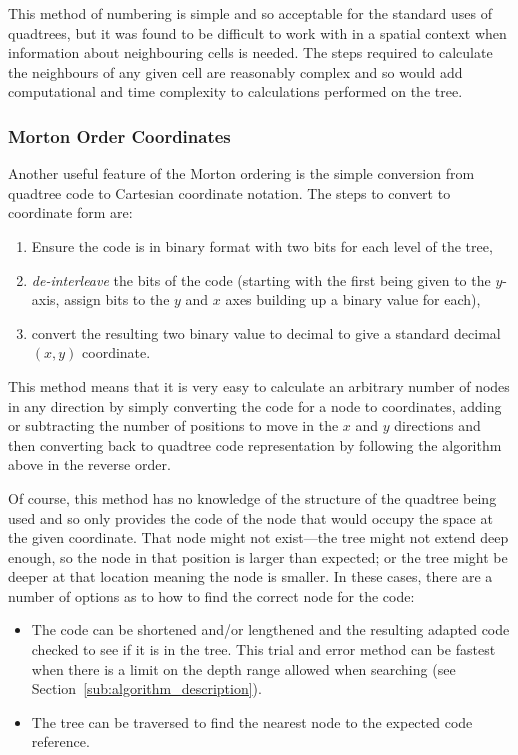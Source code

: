 This method of numbering is simple and so acceptable for the standard uses of
quadtrees, but it was found to be difficult to work with in a spatial context
when information about neighbouring cells is needed. The steps required to
calculate the neighbours of any given cell are reasonably complex and so would
add computational and time complexity to calculations performed on the tree.

\subsubsection*{Morton Order Coordinates}
\label{ssub:morton_order_coordinates}

Another useful feature of the Morton ordering is the simple conversion from
quadtree code to Cartesian coordinate notation. The steps to convert to
coordinate form are:

\begin{enumerate}
	\item Ensure the code is in binary format with two bits for each level of
		the tree,
	\item \emph{de-interleave} the bits of the code (starting with the first
		being given to the $y$-axis, assign bits to the $y$ and $x$ axes
		building up a binary value for each),
	\item convert the resulting two binary value to decimal to give a standard
		decimal $(x,y)$ coordinate.
\end{enumerate}

This method means that it is very easy to calculate an arbitrary number of
nodes in any direction by simply converting the code for a node to coordinates,
adding or subtracting the number of positions to move in the $x$ and $y$
directions and then converting back to quadtree code representation by
following the algorithm above in the reverse order.

Of course, this method has no knowledge of the structure of the quadtree being
used and so only provides the code of the node that would occupy the space at
the given coordinate. That node might not exist---the tree might not extend
deep enough, so the node in that position is larger than expected; or the tree
might be deeper at that location meaning the node is smaller. In these cases,
there are a number of options as to how to find the correct node for the code:

\begin{itemize}
	\item The code can be shortened and/or lengthened and the resulting adapted
		code checked to see if it is in the tree. This trial and error method
		can be fastest when there is a limit on the depth range allowed when
		searching (see Section~\ref{sub:algorithm_description}).
	\item The tree can be traversed to find the nearest node to the expected
		code reference.
\end{itemize}

